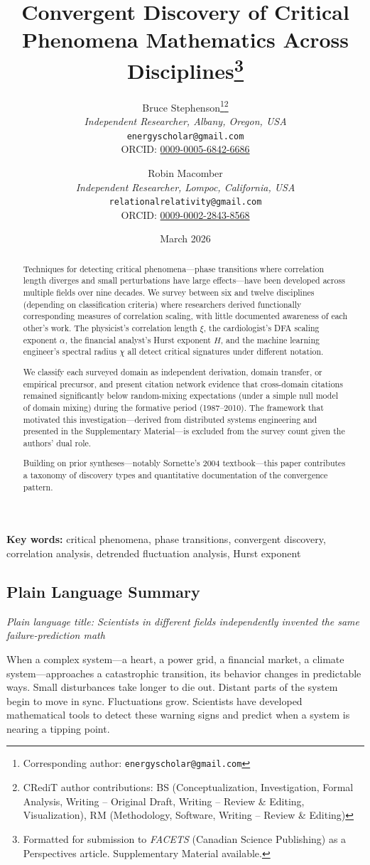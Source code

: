 \documentclass[11pt]{article}
\title{Convergent Discovery of Critical Phenomena Mathematics Across Disciplines\thanks{Formatted for submission to \textit{FACETS} (Canadian Science Publishing) as a Perspectives article. Supplementary Material available.}}
\author{
    Bruce Stephenson\thanks{Corresponding author: \texttt{energyscholar@gmail.com}}\thanks{CRediT author contributions: BS (Conceptualization, Investigation, Formal Analysis, Writing -- Original Draft, Writing -- Review \& Editing, Visualization), RM (Methodology, Software, Writing -- Review \& Editing)} \\
    \textit{Independent Researcher, Albany, Oregon, USA} \\
    \texttt{energyscholar@gmail.com} \\
    ORCID: \href{https://orcid.org/0009-0005-6842-6686}{0009-0005-6842-6686}
    \and
    Robin Macomber \\
    \textit{Independent Researcher, Lompoc, California, USA} \\
    \texttt{relationalrelativity@gmail.com} \\
    ORCID: \href{https://orcid.org/0009-0002-2843-8568}{0009-0002-2843-8568}
}
\date{March 2026}
\begin{document}
\maketitle
\thispagestyle{plain}
\doublespacing

\begin{abstract}
Techniques for detecting critical phenomena---phase transitions where correlation length diverges and small perturbations have large effects---have been developed across multiple fields over nine decades. We survey between six and twelve disciplines (depending on classification criteria) where researchers derived functionally corresponding measures of correlation scaling, with little documented awareness of each other's work. The physicist's correlation length $\xi$, the cardiologist's DFA scaling exponent $\alpha$, the financial analyst's Hurst exponent $H$, and the machine learning engineer's spectral radius $\chi$ all detect critical signatures under different notation.

We classify each surveyed domain as independent derivation, domain transfer, or empirical precursor, and present citation network evidence that cross-domain citations remained significantly below random-mixing expectations (under a simple null model of domain mixing) during the formative period (1987--2010). The framework that motivated this investigation---derived from distributed systems engineering and presented in the Supplementary Material---is excluded from the survey count given the authors' dual role.

Building on prior syntheses---notably Sornette's 2004 textbook---this paper contributes a taxonomy of discovery types and quantitative documentation of the convergence pattern.
\end{abstract}

\noindent\textbf{Key words:} critical phenomena, phase transitions, convergent discovery, correlation analysis, detrended fluctuation analysis, Hurst exponent

\subsection*{Plain Language Summary}

\noindent\textit{Plain language title: Scientists in different fields independently invented the same failure-prediction math}

\medskip

When a complex system---a heart, a power grid, a financial market, a climate system---approaches a catastrophic transition, its behavior changes in predictable ways. Small disturbances take longer to die out. Distant parts of the system begin to move in sync. Fluctuations grow. Scientists have developed mathematical tools to detect these warning signs and predict when a system is nearing a tipping point.
\end{document}
